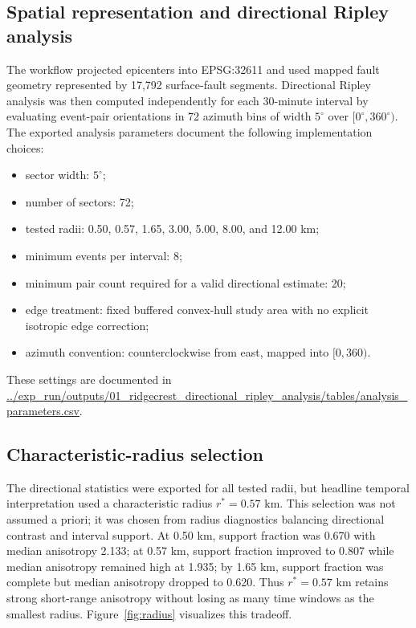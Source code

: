\documentclass[11pt]{article}
\begin{document}
\subsection{Spatial representation and directional Ripley analysis}
The workflow projected epicenters into EPSG:32611 and used mapped fault geometry represented by 17,792 surface-fault segments. Directional Ripley analysis was then computed independently for each 30-minute interval by evaluating event-pair orientations in 72 azimuth bins of width $5^{\circ}$ over $[0^{\circ},360^{\circ})$. The exported analysis parameters document the following implementation choices:
\begin{itemize}[leftmargin=2em]
    \item sector width: $5^{\circ}$;
    \item number of sectors: 72;
    \item tested radii: 0.50, 0.57, 1.65, 3.00, 5.00, 8.00, and 12.00 km;
    \item minimum events per interval: 8;
    \item minimum pair count required for a valid directional estimate: 20;
    \item edge treatment: fixed buffered convex-hull study area with no explicit isotropic edge correction;
    \item azimuth convention: counterclockwise from east, mapped into $[0,360)$.
\end{itemize}
These settings are documented in
\url{../exp_run/outputs/01_ridgecrest_directional_ripley_analysis/tables/analysis_parameters.csv}.

\subsection{Characteristic-radius selection}
The directional statistics were exported for all tested radii, but headline temporal interpretation used a characteristic radius $r^{\ast}=0.57$ km. This selection was not assumed a priori; it was chosen from radius diagnostics balancing directional contrast and interval support. At 0.50 km, support fraction was 0.670 with median anisotropy 2.133; at 0.57 km, support fraction improved to 0.807 while median anisotropy remained high at 1.935; by 1.65 km, support fraction was complete but median anisotropy dropped to 0.620. Thus $r^{\ast}=0.57$ km retains strong short-range anisotropy without losing as many time windows as the smallest radius. Figure~\ref{fig:radius} visualizes this tradeoff.
\end{document}
